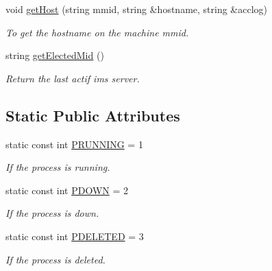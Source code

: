 \begin{DoxyCompactItemize}
void \hyperlink{classProcessServer_ac99cd39c216e9c03c857241e093dbbe9}{getHost} (string mmid, string \&hostname, string \&acclog)
\begin{DoxyCompactList}\small\item\em To get the hostname on the machine mmid. \item\end{DoxyCompactList}\item 
string \hyperlink{classProcessServer_a496974be492e966314d02df205daf2a5}{getElectedMid} ()
\begin{DoxyCompactList}\small\item\em Return the last actif ims server. \item\end{DoxyCompactList}\end{DoxyCompactItemize}
\subsection*{Static Public Attributes}
\begin{DoxyCompactItemize}
\item 
\hypertarget{classProcessServer_abe30c8b0c7e0e3fd38cff2e89b19a90b}{
static const int \hyperlink{classProcessServer_abe30c8b0c7e0e3fd38cff2e89b19a90b}{PRUNNING} = 1}
\label{classProcessServer_abe30c8b0c7e0e3fd38cff2e89b19a90b}

\begin{DoxyCompactList}\small\item\em If the process is running. \item\end{DoxyCompactList}\item 
\hypertarget{classProcessServer_ab2ca26a8193db9c0fa29131e627fed39}{
static const int \hyperlink{classProcessServer_ab2ca26a8193db9c0fa29131e627fed39}{PDOWN} = 2}
\label{classProcessServer_ab2ca26a8193db9c0fa29131e627fed39}

\begin{DoxyCompactList}\small\item\em If the process is down. \item\end{DoxyCompactList}\item 
\hypertarget{classProcessServer_a475fd76642aa4fc0909c09d16c5544d8}{
static const int \hyperlink{classProcessServer_a475fd76642aa4fc0909c09d16c5544d8}{PDELETED} = 3}
\label{classProcessServer_a475fd76642aa4fc0909c09d16c5544d8}

\begin{DoxyCompactList}\small\item\em If the process is deleted. \item\end{DoxyCompactList}\end{DoxyCompactItemize}

